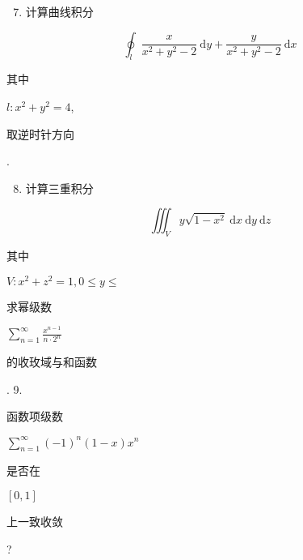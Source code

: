 \documentclass[10pt]{article}
\begin{document}
\begin{enumerate}
  \setcounter{enumi}{6}
  \item \begin{CJK}{UTF8}{mj}计算曲线积分\end{CJK}
\end{enumerate}
$$
\oint_{l} \frac{x}{x^{2}+y^{2}-2} \mathrm{~d} y+\frac{y}{x^{2}+y^{2}-2} \mathrm{~d} x
$$
\begin{CJK}{UTF8}{mj}其中\end{CJK} $l: x^{2}+y^{2}=4$, \begin{CJK}{UTF8}{mj}取逆时针方向\end{CJK}.

\begin{enumerate}
  \setcounter{enumi}{7}
  \item \begin{CJK}{UTF8}{mj}计算三重积分\end{CJK}
\end{enumerate}
$$
\iiint_{V} y \sqrt{1-x^{2}} \mathrm{~d} x \mathrm{~d} y \mathrm{~d} z
$$
\begin{CJK}{UTF8}{mj}其中\end{CJK} $V: x^{2}+z^{2}=1,0 \leqslant y \leqslant$\\
\begin{CJK}{UTF8}{mj}求幂级数\end{CJK} $\sum_{n=1}^{\infty} \frac{x^{n-1}}{n \cdot 2^{n}}$ \begin{CJK}{UTF8}{mj}的收玫域与和函数\end{CJK}. 9. \begin{CJK}{UTF8}{mj}函数项级数\end{CJK} $\sum_{n=1}^{\infty}(-1)^{n}(1-x) x^{n}$ \begin{CJK}{UTF8}{mj}是否在\end{CJK} $[0,1]$ \begin{CJK}{UTF8}{mj}上一致收敛\end{CJK}?
\end{document}
